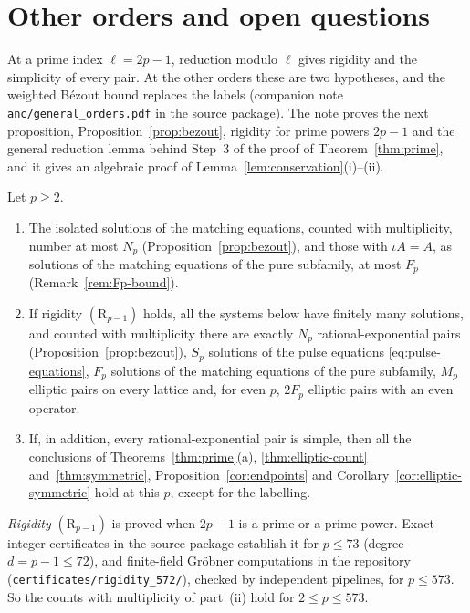 \section{Other orders and open questions}\label{sec:further}

At a prime index \(\ell=2p-1\), reduction modulo \(\ell\) gives
rigidity and the simplicity of every pair. At the other orders these are
two hypotheses, and the weighted B\'ezout bound replaces the labels
(companion note \texttt{anc/general\_orders.pdf} in the source package).
The note proves the next proposition, Proposition~\ref{prop:bezout},
rigidity for prime powers \(2p-1\) and the general reduction lemma
behind Step~3 of the proof of Theorem~\ref{thm:prime}, and it gives an
algebraic proof of Lemma~\ref{lem:conservation}(i)--(ii).

\begin{proposition}\label{prop:general}
Let \(p\ge2\).
\begin{enumerate}
\item[\textup{(i)}] The isolated solutions of the matching equations,
counted with multiplicity, number at most \(N_p\)
(Proposition~\ref{prop:bezout}), and those with \(\iota A=A\), as
solutions of the matching equations of the pure subfamily, at most
\(F_p\) (Remark~\ref{rem:Fp-bound}).
\item[\textup{(ii)}] If rigidity \((\mathrm R_{p-1})\) holds, all the
systems below have finitely many solutions, and counted with
multiplicity there are exactly \(N_p\) rational-exponential pairs
(Proposition~\ref{prop:bezout}), \(S_p\) solutions of the pulse
equations \eqref{eq:pulse-equations}, \(F_p\) solutions of the matching
equations of the pure subfamily, \(M_p\) elliptic pairs on every
lattice and, for even \(p\), \(2F_p\) elliptic pairs with an even
operator.
\item[\textup{(iii)}] If, in addition, every rational-exponential pair
is simple, then all the conclusions of Theorems~\ref{thm:prime}(a),
\ref{thm:elliptic-count} and~\ref{thm:symmetric},
Proposition~\ref{cor:endpoints} and
Corollary~\ref{cor:elliptic-symmetric} hold at this \(p\), except for
the labelling.
\end{enumerate}
\end{proposition}

\emph{Rigidity} \((\mathrm R_{p-1})\) is proved when \(2p-1\) is a prime
or a prime power. Exact integer certificates in the source package
establish it for \(p\le73\) (degree \(d=p-1\le72\)), and finite-field
Gr\"obner computations in the repository
(\texttt{certificates/rigidity\_572/}), checked by independent
pipelines, for \(p\le573\). So the counts with multiplicity of
part~(ii) hold for \(2\le p\le573\).

